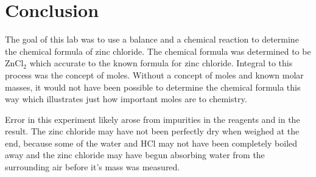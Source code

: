 \documentclass[12pt]{article}
\begin{document}
    \section*{Conclusion}
        The goal of this lab was to use a balance and a chemical reaction to determine the chemical formula of zinc chloride. The chemical formula was determined to be ZnCl\(_2\) which accurate to the known formula for zinc chloride. Integral to this process was the concept of moles. Without a concept of moles and known molar masses, it would not have been possible to determine the chemical formula this way which illustrates just how important moles are to chemistry. 

        Error in this experiment likely arose from impurities in the reagents and in the result. The zinc chloride may have not been perfectly dry when weighed at the end, because some of the water and HCl may not have been completely boiled away and the zinc chloride may have begun absorbing water from the surrounding air before it's mass was measured.
\end{document}
